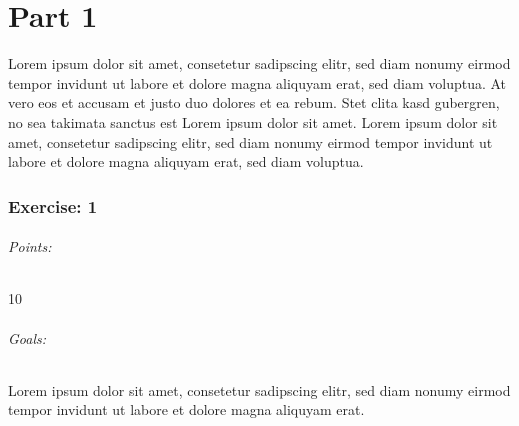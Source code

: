 




\part*{Part 1}
Lorem ipsum dolor sit amet, consetetur sadipscing elitr, sed diam nonumy eirmod tempor invidunt ut labore et dolore magna aliquyam erat, sed diam voluptua. At vero eos et accusam et justo duo dolores et ea rebum. Stet clita kasd gubergren, no sea takimata sanctus est Lorem ipsum dolor sit amet. Lorem ipsum dolor sit amet, consetetur sadipscing elitr, sed diam nonumy eirmod tempor invidunt ut labore et dolore magna aliquyam erat, sed diam voluptua.

\section{Exercise: 1}
\paragraph{Points:} 10
\paragraph{Goals:}
Lorem ipsum dolor sit amet, consetetur sadipscing elitr, sed diam nonumy eirmod tempor invidunt ut labore et dolore magna aliquyam erat.




